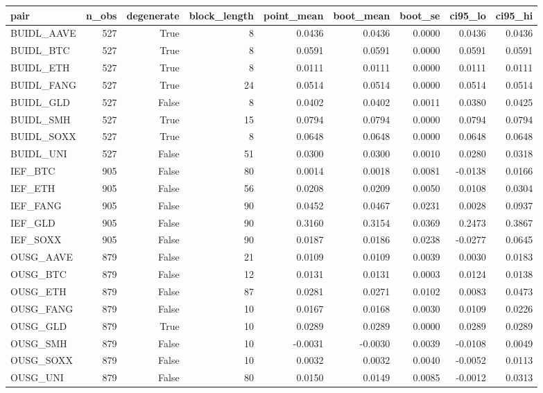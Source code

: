 \begin{tabular}{lrrrrrrrr}
\toprule
pair & n\_obs & degenerate & block\_length & point\_mean & boot\_mean & boot\_se & ci95\_lo & ci95\_hi \\
\midrule
BUIDL\_AAVE & 527 & True & 8 & 0.0436 & 0.0436 & 0.0000 & 0.0436 & 0.0436 \\
BUIDL\_BTC & 527 & True & 8 & 0.0591 & 0.0591 & 0.0000 & 0.0591 & 0.0591 \\
BUIDL\_ETH & 527 & True & 8 & 0.0111 & 0.0111 & 0.0000 & 0.0111 & 0.0111 \\
BUIDL\_FANG & 527 & True & 24 & 0.0514 & 0.0514 & 0.0000 & 0.0514 & 0.0514 \\
BUIDL\_GLD & 527 & False & 8 & 0.0402 & 0.0402 & 0.0011 & 0.0380 & 0.0425 \\
BUIDL\_SMH & 527 & True & 15 & 0.0794 & 0.0794 & 0.0000 & 0.0794 & 0.0794 \\
BUIDL\_SOXX & 527 & True & 8 & 0.0648 & 0.0648 & 0.0000 & 0.0648 & 0.0648 \\
BUIDL\_UNI & 527 & False & 51 & 0.0300 & 0.0300 & 0.0010 & 0.0280 & 0.0318 \\
IEF\_BTC & 905 & False & 80 & 0.0014 & 0.0018 & 0.0081 & -0.0138 & 0.0166 \\
IEF\_ETH & 905 & False & 56 & 0.0208 & 0.0209 & 0.0050 & 0.0108 & 0.0304 \\
IEF\_FANG & 905 & False & 90 & 0.0452 & 0.0467 & 0.0231 & 0.0028 & 0.0937 \\
IEF\_GLD & 905 & False & 90 & 0.3160 & 0.3154 & 0.0369 & 0.2473 & 0.3867 \\
IEF\_SOXX & 905 & False & 90 & 0.0187 & 0.0186 & 0.0238 & -0.0277 & 0.0645 \\
OUSG\_AAVE & 879 & False & 21 & 0.0109 & 0.0109 & 0.0039 & 0.0030 & 0.0183 \\
OUSG\_BTC & 879 & False & 12 & 0.0131 & 0.0131 & 0.0003 & 0.0124 & 0.0138 \\
OUSG\_ETH & 879 & False & 87 & 0.0281 & 0.0271 & 0.0102 & 0.0083 & 0.0473 \\
OUSG\_FANG & 879 & False & 10 & 0.0167 & 0.0168 & 0.0030 & 0.0109 & 0.0226 \\
OUSG\_GLD & 879 & True & 10 & 0.0289 & 0.0289 & 0.0000 & 0.0289 & 0.0289 \\
OUSG\_SMH & 879 & False & 10 & -0.0031 & -0.0030 & 0.0039 & -0.0108 & 0.0049 \\
OUSG\_SOXX & 879 & False & 10 & 0.0032 & 0.0032 & 0.0040 & -0.0052 & 0.0113 \\
OUSG\_UNI & 879 & False & 80 & 0.0150 & 0.0149 & 0.0085 & -0.0012 & 0.0313 \\

\end{tabular}
